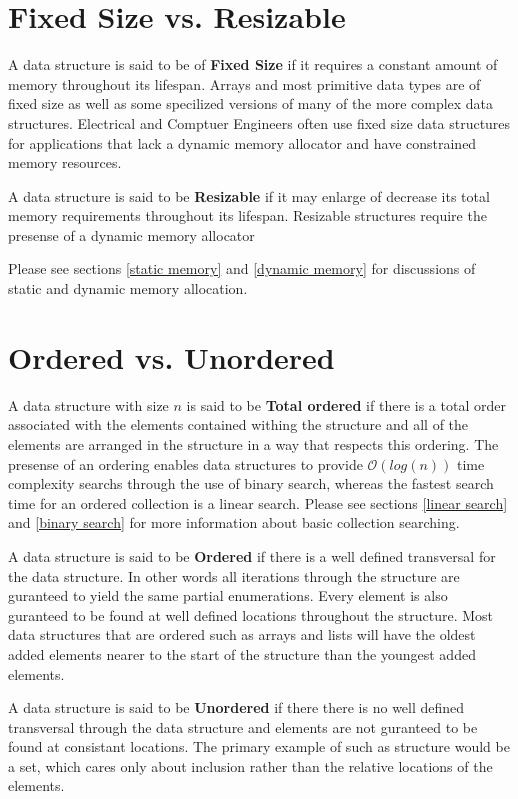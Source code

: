 \documentclass[12pt, letterpaper]{book}
\newcommand{\bigO}{\mathcal{O}}
\begin{document}
\section{Fixed Size vs. Resizable}

A data structure is said to be of \textbf{Fixed Size} if it requires a constant amount of memory throughout its lifespan. Arrays and most primitive data types are of fixed size as well as some specilized versions of many of the more complex data structures. Electrical and Comptuer Engineers often use fixed size data structures for applications that lack a dynamic memory allocator and have constrained memory resources.

A data structure is said to be \textbf{Resizable} if it may enlarge of decrease its total memory requirements throughout its lifespan. Resizable structures require the presense of a dynamic memory allocator

Please see sections \ref{static memory} and \ref{dynamic memory} for discussions of static and dynamic memory allocation.

\section{Ordered vs. Unordered}

A data structure with size $n$ is said to be \textbf{Total ordered} if there is a total order associated with the elements contained withing the structure and all of the elements are arranged in the structure in a way that respects this ordering. The presense of an ordering enables data structures to provide $\bigO(log(n))$ time complexity searchs through the use of binary search, whereas the fastest search time for an ordered collection is a linear search. Please see sections \ref{linear search} and \ref{binary search} for more information about basic collection searching.

A data structure is said to be \textbf{Ordered} if there is a well defined transversal for the data structure. In other words all iterations through the structure are guranteed to yield the same partial enumerations. Every element is also guranteed to be found at well defined locations throughout the structure. Most data structures that are ordered such as arrays and lists will have the oldest added elements nearer to the start of the structure than the youngest added elements.

A data structure is said to be \textbf{Unordered} if there there is no well defined transversal through the data structure and elements are not guranteed to be found at consistant locations. The primary example of such as structure would be a set, which cares only about inclusion rather than the relative locations of the elements.
\end{document}

